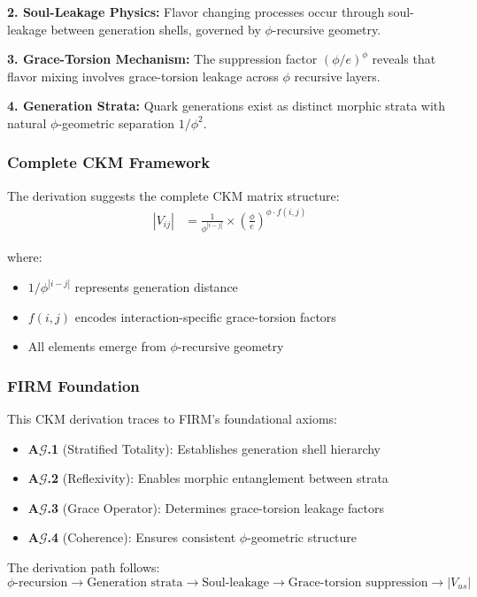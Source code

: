 \textbf{2. Soul-Leakage Physics:}
Flavor changing processes occur through soul-leakage between generation shells, governed by $\phi$-recursive geometry.

\textbf{3. Grace-Torsion Mechanism:}
The suppression factor $(\phi/e)^\phi$ reveals that flavor mixing involves grace-torsion leakage across $\phi$ recursive layers.

\textbf{4. Generation Strata:}
Quark generations exist as distinct morphic strata with natural $\phi$-geometric separation $1/\phi^2$.

\subsubsection{Complete CKM Framework}

The derivation suggests the complete CKM matrix structure:
\begin{align}
|V_{ij}| &= \frac{1}{\phi^{|i-j|}} \times \left(\frac{\phi}{e}\right)^{\phi \cdot f(i,j)}
\end{align}

where:
\begin{itemize}
\item $1/\phi^{|i-j|}$ represents generation distance
\item $f(i,j)$ encodes interaction-specific grace-torsion factors
\item All elements emerge from $\phi$-recursive geometry
\end{itemize}

\subsubsection{FIRM Foundation}

This CKM derivation traces to FIRM's foundational axioms:

\begin{itemize}
\item \textbf{A$\mathcal{G}$.1} (Stratified Totality): Establishes generation shell hierarchy
\item \textbf{A$\mathcal{G}$.2} (Reflexivity): Enables morphic entanglement between strata  
\item \textbf{A$\mathcal{G}$.3} (Grace Operator): Determines grace-torsion leakage factors
\item \textbf{A$\mathcal{G}$.4} (Coherence): Ensures consistent $\phi$-geometric structure
\end{itemize}

The derivation path follows:
$$\phi\text{-recursion} \to \text{Generation strata} \to \text{Soul-leakage} \to \text{Grace-torsion suppression} \to |V_{us}|$$

